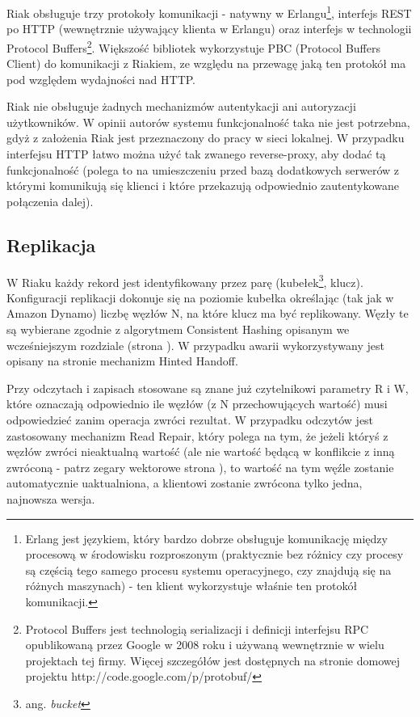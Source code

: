 Riak obsługuje trzy protokoły komunikacji - natywny w Erlangu\footnote{Erlang jest językiem, który bardzo dobrze obsługuje komunikację między procesową w środowisku rozproszonym (praktycznie bez różnicy czy procesy są częścią tego samego procesu systemu operacyjnego, czy znajdują się na różnych maszynach) - ten klient wykorzystuje właśnie ten protokół komunikacji.}, interfejs REST po HTTP (wewnętrznie używający klienta w Erlangu) oraz interfejs w technologii Protocol Buffers\footnote{Protocol Buffers jest technologią serializacji i definicji interfejsu RPC opublikowaną przez Google w 2008 roku i używaną wewnętrznie w wielu projektach tej firmy. Więcej szczegółów jest dostępnych na stronie domowej projektu http://code.google.com/p/protobuf/}.
Większość bibliotek wykorzystuje PBC (Protocol Buffers Client) do komunikacji z Riakiem, ze względu na przewagę jaką ten protokół ma pod względem wydajności nad HTTP.

Riak nie obsługuje żadnych mechanizmów autentykacji ani autoryzacji użytkowników.
W opinii autorów systemu funkcjonalność taka nie jest potrzebna, gdyż z założenia Riak jest przeznaczony do pracy w sieci lokalnej.
W przypadku interfejsu HTTP łatwo można użyć tak zwanego reverse-proxy, aby dodać tą funkcjonalność (polega to na umieszczeniu przed bazą dodatkowych serwerów z którymi komunikują się klienci i które przekazują odpowiednio zautentykowane połączenia dalej).

\subsection*{Replikacja}

W Riaku każdy rekord jest identyfikowany przez parę (kubełek\footnote{ang. \emph{bucket}}, klucz).
Konfiguracji replikacji dokonuje się na poziomie kubełka określając (tak jak w Amazon Dynamo) liczbę węzłów N, na które klucz ma być replikowany.
Węzły te są wybierane zgodnie z algorytmem Consistent Hashing opisanym we wcześniejszym rozdziale (strona \pageref{sec:dynamo-consistent-hashing}).
W przypadku awarii wykorzystywany jest opisany na stronie \pageref{sec:dynamo-hinted-handoff} mechanizm Hinted Handoff.

Przy odczytach i zapisach stosowane są znane już czytelnikowi parametry R i W, które oznaczają odpowiednio ile węzłów (z N przechowujących wartość) musi odpowiedzieć zanim operacja zwróci rezultat.
W przypadku odczytów jest zastosowany mechanizm Read Repair, który polega na tym, że jeżeli któryś z węzłów zwróci nieaktualną wartość (ale nie wartość będącą w konflikcie z inną zwróconą - patrz zegary wektorowe strona \pageref{sec:dynamo-vector-clocks}), to wartość na tym węźle zostanie automatycznie uaktualniona, a klientowi zostanie zwrócona tylko jedna, najnowsza wersja. 

